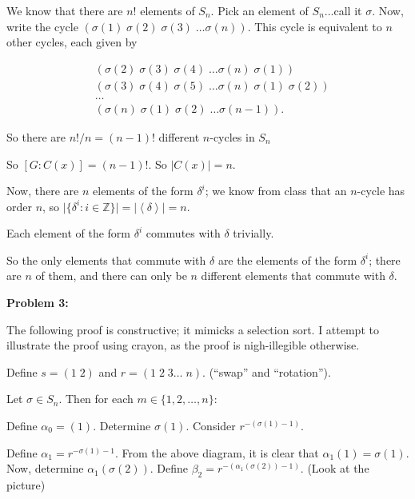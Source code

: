 \documentclass[a4paper,12pt]{article}
\newcommand{\tab}{\hspace{4mm}} %
\newcommand{\shunt}{\vspace{20mm}}
\newcommand{\absval}[1]{\lvert #1 \rvert}
\newcommand{\anbrack}[1]{\left\langle #1 \right\rangle}
\newcommand{\al}{\alpha} %
\newcommand{\be}{\beta}
\newcommand{\de}{\delta}
\newcommand{\Z}{\mathbb{Z}}
\begin{document}
\tab We know that there are $n!$ elements of $S_n$. Pick an element of $S_n$...call it $\sigma$. Now, write the cycle $(\sigma(1) \; \sigma(2) \; \sigma(3) \; \ldots \sigma(n))$. This cycle is equivalent to $n$ other cycles, each given by

\begin{align*}
&(\sigma(2) \; \sigma(3) \; \sigma(4) \; \ldots \sigma(n) \; \sigma(1))\\
&(\sigma(3) \; \sigma(4) \; \sigma(5) \; \ldots \sigma(n) \; \sigma(1) \; \sigma(2))\\
&\ldots \\
&(\sigma(n) \; \sigma(1) \; \sigma(2) \; \ldots \sigma(n-1)).
\end{align*}

\tab So there are $n!/n = (n-1)!$ different $n$-cycles in $S_n$

So $[G:C(x)] = (n-1)!$. So $\absval{C(x)} = n$.

Now, there are $n$ elements of the form $\de^i$; we know from class that an $n$-cycle has order $n$, so $\absval{\{\de^i: i \in \Z\}}=\absval{\anbrack{\de}} = n$.

Each element of the form $\de^i$ commutes with $\de$ trivially.

So the only elements that commute with $\de$ are the elements of the form $\de^i$; there are $n$ of them, and there can only be $n$ different elements that commute with $\de$.

\shunt

{\bf Problem 3:}

The following proof is constructive; it mimicks a selection sort. I attempt to illustrate the proof using crayon, as the proof is nigh-illegible otherwise.

Define $s = (1 \; 2)$ and $r = (1 \; 2 \; 3 \ldots \; n)$. (``swap'' and ``rotation'').

\shunt %

\shunt

Let $\sigma \in S_n$. Then for each $m \in \{1,2, \ldots ,n\}$:

\tab Define $\al_0 = (1)$. Determine $\sigma(1)$. Consider $r^{-(\sigma(1)-1)}$.

\shunt %

\shunt

\tab Define $\al_1 = r^{-\sigma(1) -1}$. From the above diagram, it is clear that $\al_1(1) = \sigma(1)$. Now, determine $\al_1(\sigma(2))$. Define $\be_2 = r^{-(\al_1(\sigma(2))-1)}$. (Look at the picture)
\end{document}
